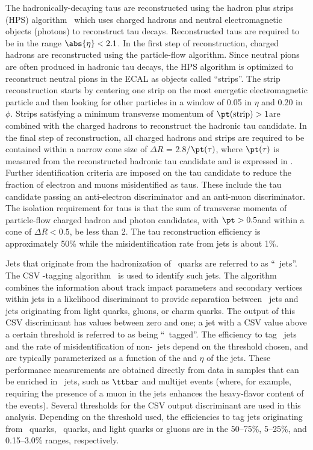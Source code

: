 \documentclass[11pt,twoside,a4paper,cmspaper,final,collab]{cms-tdr}
\begin{document}
The hadronically-decaying taus are reconstructed using the hadron plus strips (HPS) algorithm~\cite{Chatrchyan:2012zz} which
uses charged hadrons and neutral electromagnetic objects (photons) to
reconstruct tau decays. Reconstructed taus are required to be in the range $\abs{\eta} < 2.1$. In the first step of reconstruction, charged hadrons are reconstructed using the particle-flow algorithm.
Since neutral pions are often produced in hadronic tau decays, the HPS algorithm is optimized to reconstruct
neutral pions in the ECAL as objects called ``strips''. The strip reconstruction starts by centering one strip on the most
energetic electromagnetic particle and then looking for other particles in a window of 0.05 in $\eta$ and 0.20 in $\phi$.
Strips satisfying a minimum transverse momentum of $\pt(\text{strip})>1$\GeV are combined with the charged hadrons
to reconstruct the hadronic tau candidate.
In the final step of reconstruction, all charged hadrons and strips are required to be contained within a narrow cone size
of $\Delta R$ = 2.8/$\pt(\tau)$, where
$\pt(\tau)$ is measured from the reconstructed hadronic tau
candidate and is expressed in \GeVns.
Further identification criteria are imposed on the tau candidate to
reduce the fraction of electron and muons misidentified as taus.
These include the tau candidate passing an anti-electron
discriminator and an anti-muon discriminator. The isolation
requirement for taus is that the sum
of transverse momenta of particle-flow charged hadron and photon
candidates, with $\pt > 0.5$\GeV and within a cone of $\Delta R<0.5$, be less than 2\GeV. The tau reconstruction efficiency is approximately
50\% while the misidentification rate from jets is about 1\%.


Jets that originate from the hadronization of \cPqb\ quarks
are referred to as ``\cPqb\ jets''.  The CSV \cPqb-tagging
algorithm~\cite{Chatrchyan:2012jua} is used to identify such jets.
The algorithm combines
the information about track impact parameters and secondary
vertices within jets in a likelihood discriminant to provide separation
between \cPqb\ jets and jets originating from light quarks, gluons, or
charm quarks. The output of this CSV discriminant has values between zero
and one; a jet with a CSV value above a certain threshold is referred to
as being ``\cPqb\ tagged''. The efficiency to tag \cPqb\ jets and the rate of
misidentification of non-\cPqb\ jets depend on the
threshold chosen, and are typically parameterized as a function of the
\pt and $\eta$ of the jets.
These performance measurements are obtained directly from data in
samples that can be enriched in \cPqb\ jets, such as $\ttbar$ and multijet
events (where, for example, requiring the presence of a muon in the
jets enhances the heavy-flavor content of the events).
Several thresholds for the CSV output discriminant are used in this analysis.
Depending on the threshold used, the efficiencies to tag jets
originating from \cPqb\ quarks, \cPqc\ quarks, and light quarks or gluons are in
the 50--75\%, 5--25\%, and 0.15--3.0\% ranges, respectively.
\end{document}
